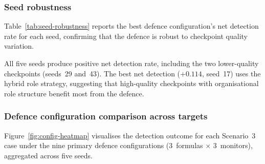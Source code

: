 \documentclass[10pt,twocolumn]{article}
\begin{document}
\subsubsection{Seed robustness}

Table~\ref{tab:seed-robustness} reports the best defence configuration's
net detection rate for each seed, confirming that the defence is robust to
checkpoint quality variation.

\begin{table}[htbp]
\centering
\caption{Defence net detection rate per seed on CERT~r4.2
(70~insiders).  Net detection = attack window recall $-$ matched control
false-alert rate.  Higher is better.  All five seeds produce positive
net detection, confirming robustness to checkpoint quality.}
\label{tab:seed-robustness}
\end{table}

All five seeds produce positive net detection rate, including the two
lower-quality checkpoints (seeds~29 and~43).  The best net detection
($+0.114$, seed~17) uses the hybrid role strategy, suggesting that
high-quality checkpoints with organisational role structure benefit most
from the defence.

\subsubsection{Defence configuration comparison across targets}

Figure~\ref{fig:config-heatmap} visualises the detection outcome for
each Scenario~3 case under the nine primary defence configurations
(3~formulas $\times$ 3~monitors), aggregated across five seeds.
\end{document}
